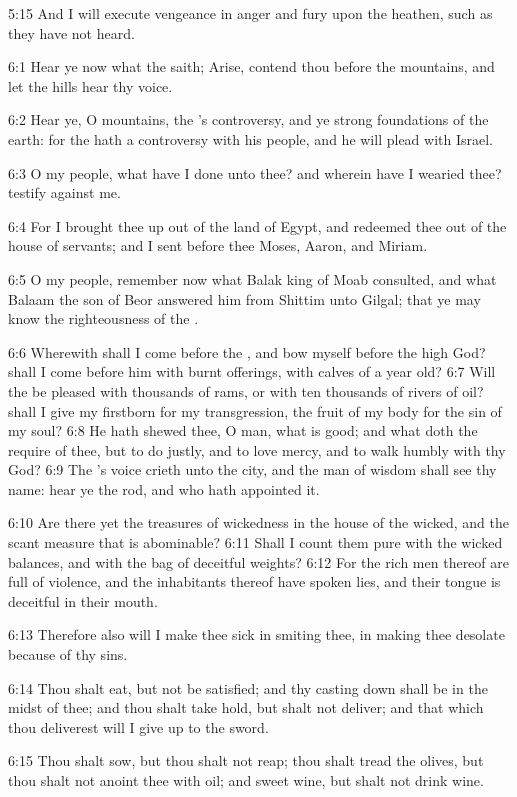 5:15 And I will execute vengeance in anger and fury upon the heathen,
such as they have not heard.

6:1 Hear ye now what the \LORD saith; Arise, contend thou before the
mountains, and let the hills hear thy voice.

6:2 Hear ye, O mountains, the \LORD's controversy, and ye strong
foundations of the earth: for the \LORD hath a controversy with his
people, and he will plead with Israel.

6:3 O my people, what have I done unto thee? and wherein have I
wearied thee? testify against me.

6:4 For I brought thee up out of the land of Egypt, and redeemed thee
out of the house of servants; and I sent before thee Moses, Aaron, and
Miriam.

6:5 O my people, remember now what Balak king of Moab consulted, and
what Balaam the son of Beor answered him from Shittim unto Gilgal;
that ye may know the righteousness of the \LORD.

6:6 Wherewith shall I come before the \LORD, and bow myself before the
high God? shall I come before him with burnt offerings, with calves of
a year old?  6:7 Will the \LORD be pleased with thousands of rams, or
with ten thousands of rivers of oil? shall I give my firstborn for my
transgression, the fruit of my body for the sin of my soul?  6:8 He
hath shewed thee, O man, what is good; and what doth the \LORD require
of thee, but to do justly, and to love mercy, and to walk humbly with
thy God?  6:9 The \LORD's voice crieth unto the city, and the man of
wisdom shall see thy name: hear ye the rod, and who hath appointed it.

6:10 Are there yet the treasures of wickedness in the house of the
wicked, and the scant measure that is abominable?  6:11 Shall I count
them pure with the wicked balances, and with the bag of deceitful
weights?  6:12 For the rich men thereof are full of violence, and the
inhabitants thereof have spoken lies, and their tongue is deceitful in
their mouth.

6:13 Therefore also will I make thee sick in smiting thee, in making
thee desolate because of thy sins.

6:14 Thou shalt eat, but not be satisfied; and thy casting down shall
be in the midst of thee; and thou shalt take hold, but shalt not
deliver; and that which thou deliverest will I give up to the sword.

6:15 Thou shalt sow, but thou shalt not reap; thou shalt tread the
olives, but thou shalt not anoint thee with oil; and sweet wine, but
shalt not drink wine.

